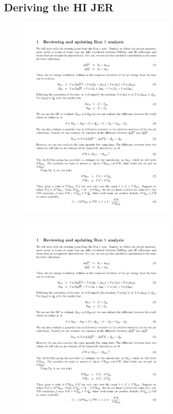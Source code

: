 \subsection{Deriving the HI JER}

\begin{figure}
\includegraphics[page=1,width=0.7\textwidth]{figures/appendixHIJERDerivation/JERUncertaintyNote} 
\end{figure}

\begin{figure}
\includegraphics[page=2,width=0.7\textwidth]{figures/appendixHIJERDerivation/JERUncertaintyNote} 
\end{figure}

